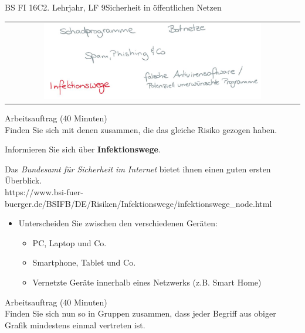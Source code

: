\documentclass[oneside,openany,headings=optiontotoc,11pt,numbers=noenddot]{scrreprt}
\begin{document}
\begin{worksheet}{BS FI 16C}{2. Lehrjahr, LF 9}{Sicherheit in öffentlichen Netzen}
		\newpage
		\setcounter{page}{1}
		\begin{framed}
			\begin{tabular}{lcr}
				& \includegraphics[width=0.8\textwidth]{Bilder/Infektionswege.jpg} & \\
			\end{tabular}
		\end{framed}
		\color{codegray}Arbeitsauftrag (40 Minuten)\\
		\color{black}
		Finden Sie sich mit denen zusammen, die das gleiche Risiko gezogen haben.
		\par
		\bigskip
		\noindent
		Informieren Sie sich über \textbf{Infektionswege}.
		\par
		\bigskip
		\noindent
		Das \textit{Bundesamt für Sicherheit im Internet} bietet ihnen einen guten ersten Überblick.\\
		\small{\color{codegray}https://www.bsi-fuer-buerger.de/BSIFB/DE/Risiken/Infektionswege/infektionswege\_node.html}
		\normalsize
		\begin{itemize}
			\item[] Unterscheiden Sie zwischen den verschiedenen Geräten:
			\begin{itemize}
				\item PC, Laptop und Co.
				\item Smartphone, Tablet und Co.
				\item Vernetzte Geräte innerhalb eines Netzwerks (z.B. Smart Home)
			\end{itemize}
		\end{itemize}
		\par
		\bigskip
		\noindent
		
		\color{codegray}Arbeitsauftrag (40 Minuten)\\
		\color{black}
		Finden Sie sich nun so in Gruppen zusammen, dass jeder Begriff aus obiger Grafik mindestens einmal vertreten ist.
	

\end{worksheet}
\end{document}
